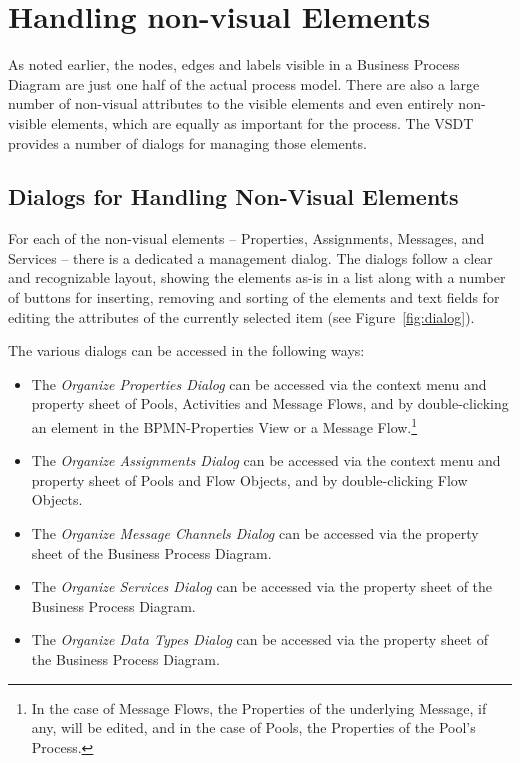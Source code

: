 \section{Handling non-visual Elements}

As noted earlier, the nodes, edges and labels visible in a Business Process
Diagram are just one half of the actual process model.  There are also a large
number of non-visual attributes to the visible elements and even entirely
non-visible elements, which are equally as important for the process.  The VSDT
provides a number of dialogs for managing those elements.



\subsection{Dialogs for Handling Non-Visual Elements}

For each of the non-visual elements -- Properties, Assignments, Messages, and
Services -- there is a dedicated a management dialog.  The dialogs follow a
clear and recognizable layout, showing the elements as-is in a list along with a
number of buttons for inserting, removing and sorting of the elements and text
fields for editing the attributes of the currently selected item (see
Figure~\ref{fig:dialog}).

The various dialogs can be accessed in the following ways:
\begin{itemize}
	\item The \emph{Organize Properties Dialog} can be accessed via the context
	menu and property sheet of Pools, Activities and Message Flows, and by
	double-clicking an element in the BPMN-Properties View or a Message
	Flow.\footnote{In the case of Message Flows, the Properties of the underlying
	Message, if any, will be edited, and in the case of Pools, the Properties of
	the Pool's Process.}
	
	\item The \emph{Organize Assignments Dialog} can be accessed via the context
	menu and property sheet of Pools and Flow Objects, and by double-clicking
	Flow Objects.
	
	\item The \emph{Organize Message Channels Dialog} can be accessed via the
	property sheet of the Business Process Diagram.
	
	\item The \emph{Organize Services Dialog} can be accessed via the property
	sheet of the Business Process Diagram.
	
	\item The \emph{Organize Data Types Dialog} can be accessed via the property
	sheet of the Business Process Diagram.
\end{itemize}

